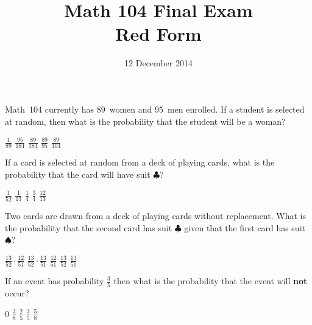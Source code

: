\documentclass[answers,12pt]{exam}
\title{Math 104 Final Exam\\Red Form}
\date{12 December 2014}
\begin{document}
\maketitle
\begin{center}
\end{center}

\begin{questions}
\question Math~104 currently has 89~women and 95~men enrolled.
If a student is selected at random, then what is the probability
that the student will be a woman?\\
\begin{oneparchoices}
\choice $\frac{1}{89}$
\choice $\frac{95}{184}$
\correctchoice\choice $\frac{89}{184}$
\choice $\frac{89}{95}$
\choice $\frac{89}{104}$
\end{oneparchoices}

\question If a card is selected at random from a deck of
playing cards, what is the probability that
the card will have suit $\clubsuit$?\\
\begin{oneparchoices}
\choice $\frac{1}{52}$
\choice $\frac{1}{13}$
\correctchoice $\frac{1}{4}$
\choice $\frac{3}{4}$
\choice $\frac{12}{13}$
\end{oneparchoices}

\question Two cards are drawn from a deck of playing cards
without replacement. What is the probability that
the second card has suit $\clubsuit$ given that the
first card has suit $\spadesuit$?\\
\begin{oneparchoices}
\choice $\frac{13}{52}\cdot\frac{12}{51}$
\choice $\frac{13}{52}\cdot\frac{13}{51}$
\choice $\frac{12}{51}$
\choice $\frac{13}{52}$
\correctchoice $\frac{13}{51}$
\end{oneparchoices}

\question If an event has probability $\frac{3}{5}$
then what is the probability that the event will {\bf not} occur?\\
\begin{oneparchoices}
\choice $0$
\choice $\frac{3}{8}$
\correctchoice $\frac{2}{5}$
\choice $\frac{3}{5}$
\choice $\frac{5}{8}$
\end{oneparchoices}


\end{questions}
\end{document}
